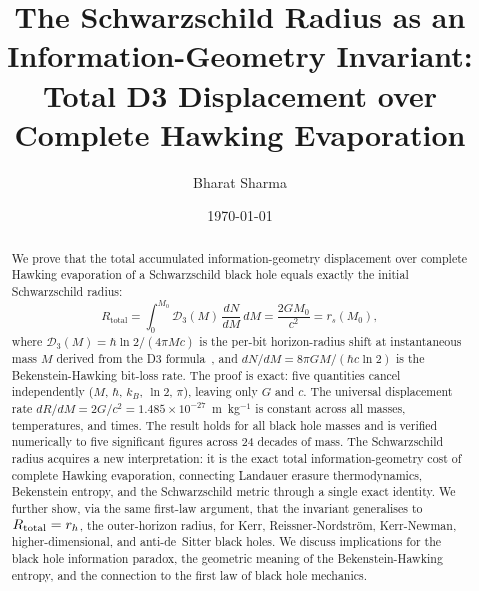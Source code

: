 \documentclass[aps,prd,twocolumn,showpacs,preprintnumbers,amsmath,amssymb,longbibliography]{revtex4-2}
\begin{document}
\title{The Schwarzschild Radius as an Information-Geometry Invariant:\\
Total D3 Displacement over Complete Hawking Evaporation}

\author{Bharat Sharma}

\date{\today}

\begin{abstract}
We prove that the total accumulated information-geometry displacement over complete 
Hawking evaporation of a Schwarzschild black hole equals exactly the initial Schwarzschild 
radius:
\begin{equation*}
R_{\mathrm{total}} = \int_0^{M_0} \mathcal{D}_3(M)\, \frac{dN}{dM}\, dM 
= \frac{2GM_0}{c^2} = r_s(M_0),
\end{equation*}
where $\mathcal{D}_3(M) = \hbar \ln 2/(4\pi Mc)$ is the per-bit horizon-radius shift at 
instantaneous mass $M$ derived from the D3 formula~\cite{sharma2026d3}, and 
$dN/dM = 8\pi GM/(\hbar c \ln 2)$ is the Bekenstein-Hawking bit-loss rate. The proof 
is exact: five quantities cancel independently ($M$, $\hbar$, $k_B$, $\ln 2$, $\pi$), 
leaving only $G$ and $c$. The universal displacement rate 
$dR/dM = 2G/c^2 = 1.485 \times 10^{-27}$~m~kg$^{-1}$ is constant across all masses, 
temperatures, and times. The result holds for all black hole masses and is verified 
numerically to five significant figures across 24 decades of mass. The Schwarzschild radius 
acquires a new interpretation: it is the exact total information-geometry cost of complete 
Hawking evaporation, connecting Landauer erasure thermodynamics, Bekenstein entropy, and 
the Schwarzschild metric through a single exact identity. We further show, via the same first-law argument, that the invariant generalises to $R_{\rm total} = r_h$, the outer-horizon radius, for Kerr, Reissner-Nordstr\"om, Kerr-Newman, higher-dimensional, and anti-de~Sitter black holes. We discuss implications for the 
black hole information paradox, the geometric meaning of the Bekenstein-Hawking entropy, 
and the connection to the first law of black hole mechanics.
\end{abstract}



\maketitle
\end{document}
